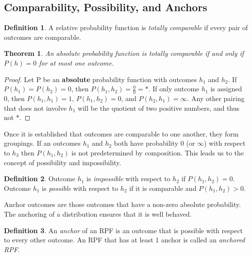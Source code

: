 \documentclass[twoside]{article}
\theoremstyle{plain}%
\newtheorem{theorem}{Theorem}[section]
\theoremstyle{definition}
\newtheorem{definition}{Definition}[section]
\theoremstyle{remark}
\begin{document}
\subsection{Comparability, Possibility, and Anchors}

\begin{definition}
\label{def:totally_comparable}
A relative probability function is \textit{totally comparable} if every pair of outcomes are comparable.
\end{definition}

\begin{theorem}
\label{thm:abs_totally_comparable}
An absolute probability function is totally comparable if and only if \(P(h) = 0\) for at most one outcome.
\end{theorem}

\begin{proof}
Let P be an \textbf{absolute} probability function with outcomes \(h_1\) and \(h_2\). If \(P(h_1) = P(h_2) = 0\), then \(P(h_1, h_2) = \frac{0}{0} = \ast\). If only outcome \(h_1\) is assigned 0, then \(P(h_1, h_1) = 1\), \(P(h_1, h_2) = 0\), and \(P(h_2, h_1) = \infty\). Any other pairing that does not involve \(h_1\) will be the quotient of two positive numbers, and thus not \(\ast\).
\end{proof}

Once it is established that outcomes are comparable to one another, they form groupings. If an outcomes \(h_1\) and \(h_2\) both have probability 0 (or \(\infty\)) with respect to \(h_3\) then \(P(h_1, h_2)\) is not predetermined by composition. This leads us to the concept of possibility and impossibility.

\begin{definition}
Outcome \(h_1\) is \textit{impossible} with respect to \(h_2\) if \(P(h_1, h_2) = 0\). Outcome \(h_1\) is \textit{possible} with respect to \(h_2\) if it is comparable and \(P(h_1, h_2) > 0\).
\end{definition}

Anchor outcomes are those outcomes that have a non-zero absolute probability. The anchoring of a distribution ensures that it is well behaved.

\begin{definition}
\label{def:anchored_rpf}
An \textit{anchor} of an RPF is an outcome that is possible with respect to every other outcome. An RPF that has at least 1 anchor is called an \textit{anchored RPF}.
\end{definition}
\end{document}
